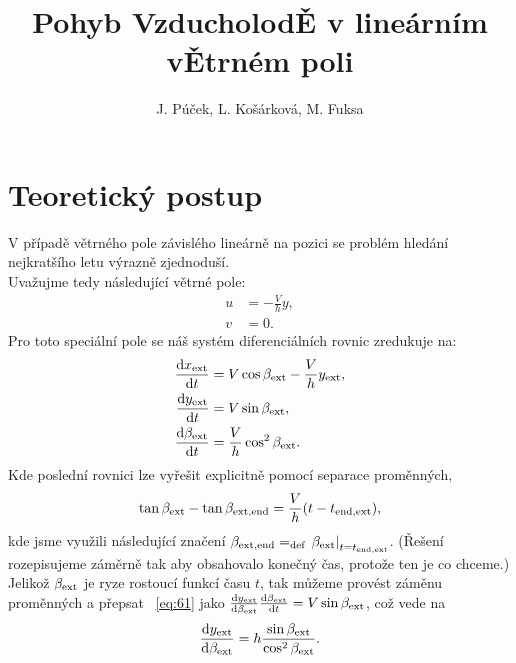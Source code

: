 \documentclass[reqno, a4paper]{amsart}
\author{J. Púček, L. Košárková, M. Fuksa}
\title{Pohyb Vzducholod\v{E} v lineárním v\v{E}trném poli}
\begin{document}
\maketitle
\section{Teoretický postup}
\label{sec:teorie}
V případě větrného pole závislého lineárně na pozici se problém hledání nejkratšího letu výrazně zjednoduší. \\
Uvažujme tedy následující větrné pole:
\begin{subequations}
  \label{eq:56}
  \begin{align}
    \label{eq:57}
    u &= - \frac{V}{h}y, \\
    \label{eq:58}
    v &= 0.
  \end{align}
\end{subequations}
Pro toto speciální pole se náš systém diferenciálních rovnic zredukuje na:
\begin{subequations}
  \label{eq:59}
  \begin{align}
    \label{eq:60}
    \frac{\mathrm{d} {x_{\mathrm{ext}}}}{\mathrm{d} {t}}
    &=
      V \cos \beta_{\mathrm{ext}} - \frac{V}{h}y_{\mathrm{ext}},  \\
    \label{eq:61}
    \frac{\mathrm{d} {y_{\mathrm{ext}}}}{\mathrm{d} {t}}
    &=
      V \sin \beta_{\mathrm{ext}},  \\
    \label{eq:62}
    \frac{\mathrm{d} {\beta_{\mathrm{ext}}}}{\mathrm{d} {t}}
    &=
      \frac{V}{h}
      \cos^2 \beta_{\mathrm{ext}}
      .
  \end{align}
\end{subequations}
Kde poslední rovnici lze vyřešit explicitně pomocí separace proměnných,
\begin{equation}
  \label{eq:63}
  \tan \beta_{\mathrm{ext}} -  \tan \beta_{\mathrm{ext}, \mathrm{end}} = \frac{V}{h} (t - t_{\mathrm{end}, \mathrm{ext}}), 
\end{equation}
kde jsme využili následující značení $\beta_{\mathrm{ext}, \mathrm{end}} = _{\mathrm{def}} \left. \beta_{\mathrm{ext}} \right|_{t = t_{\mathrm{end}, \mathrm{ext}}} $. (Řešení rozepisujeme záměrně tak aby obsahovalo konečný čas, protože ten je co chceme.) Jelikož $\beta_{\mathrm{ext}}$ je ryze rostoucí funkcí času $t$, tak můžeme provést záměnu proměnných a přepsat ~\eqref{eq:61} jako
$
  \frac{\mathrm{d} {y_{\mathrm{ext}}}}{\mathrm{d} {\beta_{\mathrm{ext}}}} \frac{\mathrm{d} {\beta_{\mathrm{ext}}}}{\mathrm{d} {t}}
  =
  V \sin \beta_{\mathrm{ext}}
$,
což vede na
\begin{equation}
  \label{eq:64}
  \frac{\mathrm{d} {y_{\mathrm{ext}}}}{\mathrm{d} {\beta_{\mathrm{ext}}}} = h \frac{\sin \beta_{\mathrm{ext}}}{\cos^2 \beta_{\mathrm{ext}}}.
\end{equation}
\end{document}
